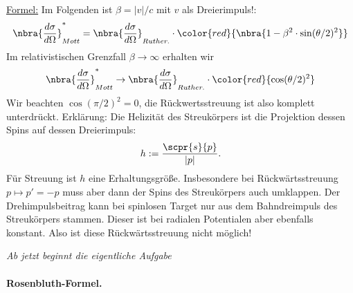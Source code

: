 \documentclass{subfiles}
\begin{document}
                \noindent\underline{Formel:} Im Folgenden ist $\beta = \vert v\vert / c$ mit $v$ als Dreierimpuls!:
                \[
                        \nbra{\frac{d\sigma}{d\Omega}}_{Mott}^* = \nbra{\frac{d\sigma}{d\Omega}}_{Ruther.}\cdot\color{red}{\nbra{1 - \beta^2\cdot\sin(\theta / 2)^2}}  
                \]
                Im relativistischen Grenzfall $\beta \to\infty$ erhalten wir 
                \[
                        \nbra{\frac{d\sigma}{d\Omega}}_{Mott}^* \to \nbra{\frac{d\sigma}{d\Omega}}_{Ruther.}\cdot\color{red}{\cos(\theta / 2)^2}  
                \]
                Wir beachten $\cos(\pi/2)^2=0$, die Rückwertsstreuung ist also komplett unterdrückt. Erklärung: Die Helizität des Streukörpers ist die Projektion dessen Spins auf dessen Dreierimpuls:
                \[
                        h := \frac{\scpr{s}{p}}{\vert p\vert}.        
                \]  
                Für Streuung ist $h$ eine Erhaltungsgröße. Insbesondere bei Rückwärtsstreuung $p\mapsto p' = -p$ muss aber dann der Spins des Streukörpers auch umklappen. Der Drehimpulsbeitrag kann bei spinlosen Target nur aus dem Bahndreimpuls des Streukörpers stammen. Dieser ist bei radialen Potentialen aber ebenfalls konstant. Also ist diese Rückwärtsstreuung nicht möglich!

                \textit{Ab jetzt beginnt die eigentliche Aufgabe}
                \paragraph{Rosenbluth-Formel.}\, \\
\end{document}
